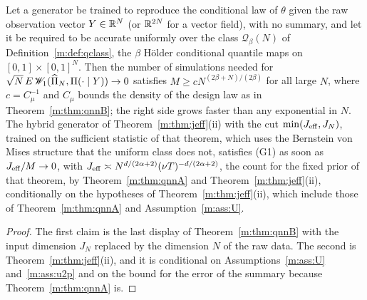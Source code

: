 \begin{theorem}\label{m:thm:raw}
Let a generator be trained to reproduce the conditional law of $\theta$ given the raw observation vector $Y\in\mathbb{R}^{N}$ (or $\mathbb{R}^{2N}$ for a vector field), with no summary, and let it be required to be accurate uniformly over the class $\mathcal Q_\beta(N)$ of Definition~\ref{m:def:qclass}, the $\beta$ H\"older conditional quantile maps on $[0,1]\times[0,1]^N$. Then the number of simulations needed for $\sqrt N\,E\,\mathscr{W}_1(\widehat\Pi_N,\Pi(\cdot\mid Y))\to0$ satisfies $M\ge cN^{(2\beta+N)/(2\beta)}$ for all large $N$, where $c=C_\mu^{-1}$ and $C_\mu$ bounds the density of the design law as in Theorem~\ref{m:thm:qnnB}; the right side grows faster than any exponential in $N$. The hybrid generator of Theorem~\ref{m:thm:jeff}(ii) with the cut $\min(J_{\rm eff},J_N)$, trained on the sufficient statistic of that theorem, which uses the Bernstein von Mises structure that the uniform class does not, satisfies (G1) as soon as $J_{\rm eff}/M\to0$, with $J_{\rm eff}\asymp N^{d/(2\alpha+2)}(\nu T)^{-d/(2\alpha+2)}$, the count for the fixed prior of that theorem, by Theorem~\ref{m:thm:qnnA} and Theorem~\ref{m:thm:jeff}(ii), conditionally on the hypotheses of Theorem~\ref{m:thm:jeff}(ii), which include those of Theorem~\ref{m:thm:qnnA} and Assumption~\ref{m:ass:U}.
\end{theorem}

\begin{proof}
The first claim is the last display of Theorem~\ref{m:thm:qnnB} with the input dimension $J_N$ replaced by the dimension $N$ of the raw data. The second is Theorem~\ref{m:thm:jeff}(ii), and it is conditional on Assumptions~\ref{m:ass:U} and~\ref{m:ass:u2p} and on the bound for the error of the summary because Theorem~\ref{m:thm:qnnA} is.
\end{proof}
